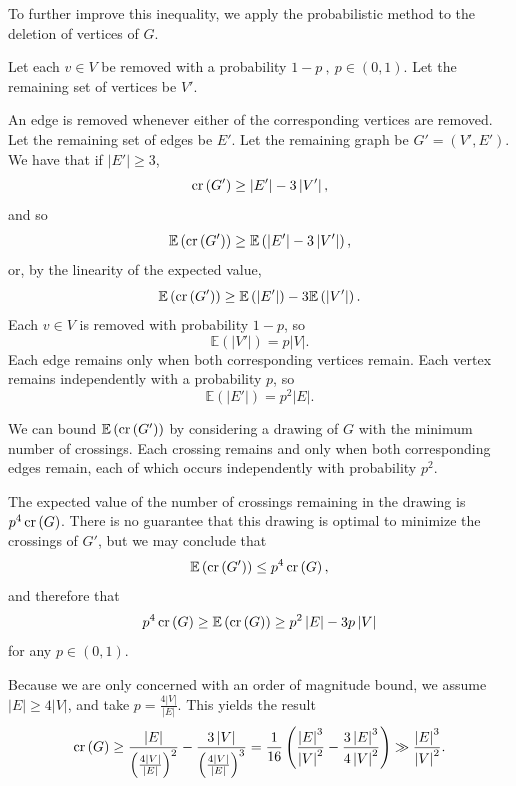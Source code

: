 \documentclass[12pt,reqno]{amsart}
\begin{document}
To further improve this inequality, we apply the probabilistic method
to the deletion of vertices of \(G\).

Let each \(v \in V\) be
removed with a probability \(1-p~,~  p \in (0,1)\). Let the remaining set of vertices be \(V'\). 

An edge is
removed whenever either of the corresponding vertices are removed. Let the remaining set of edges be \(E'\). Let the remaining graph be
\(G' = (V',E')\). We have that if \(\left\lvert E' \right\rvert \geq 3\),
\[
    \operatorname{cr}\left( G' \right) \geq \left\lvert E' \right\rvert - 3 \left\lvert V' \right\rvert 
,\]
and so
\[
    \mathbb{E} \left( \operatorname{cr}\left( G' \right)  \right) \geq \mathbb{E} \left( \left\lvert E' \right\rvert - 3 \left\lvert V' \right\rvert  \right) 
,\]
or, by the linearity of the expected value,
\[
    \mathbb{E} \left( \operatorname{cr}\left( G' \right)  \right) \geq \mathbb{E} \left( \left\lvert E' \right\rvert  \right) - 3 \mathbb{E} \left( \left\lvert V' \right\rvert  \right)    
.\]
Each \(v \in V\) is removed with probability \(1-p\), so
\[
    \mathbb{E} \left( \left\lvert V' \right\rvert  \right) = p \left\lvert V \right\rvert 
.\]
Each edge remains only when both corresponding vertices remain. Each vertex remains
independently with a probability \(p\), so 
\[
    \mathbb{E} \left( \left\lvert E' \right\rvert  \right) = p^{2}\left\lvert E \right\rvert 
.\]

We can bound \(\mathbb{E} \left( \operatorname{cr}\left( G' \right)  \right) \) by considering a drawing of \(G\) with the minimum number of crossings. 
Each crossing remains and only when both corresponding edges remain, each of which occurs independently with probability
\(p^{2}\).

The expected value of the number of crossings remaining in the drawing is \(p^{4} \operatorname{cr}\left( G \right) \).
There is no guarantee that this drawing is optimal to minimize the crossings of \(G'\), but we may conclude that
\[
    \mathbb{E} \left( \operatorname{cr}\left( G' \right)  \right) \leq p ^{4} \operatorname{cr}\left( G \right)
,\]
and therefore that
\[
    p^{4} \operatorname{cr}\left( G \right) \geq \mathbb{E} \left( \operatorname{cr}\left( G \right)  \right) \geq p^{2} \left\lvert E \right\rvert - 3 p \left\lvert V \right\rvert 
\]
for any \(p \in (0,1)\). 


Because we are only concerned with an order of magnitude bound, we assume \(\left\lvert E \right\rvert \geq 4\left\lvert V \right\rvert \), and take \(p = \frac{4\left\lvert V \right\rvert }{\left\lvert E \right\rvert }\).
This yields the result
\[
    \operatorname{cr}\left( G \right) \geq \frac{\left\lvert E \right\rvert }{\left( \frac{4 \left\lvert V \right\rvert }{\left\lvert E \right\rvert }   \right)^{2} } - \frac{3 \left\lvert V \right\rvert }{\left( \frac{4 \left\lvert V \right\rvert }{\left\lvert E \right\rvert }  \right) ^{3} } = \frac{1}{16} \left( \frac{\left\lvert E \right\rvert ^{3} }{\left\lvert V \right\rvert ^{2}} - \frac{3 \left\lvert E \right\rvert ^{3} }{4 \left\lvert V \right\rvert ^{2}}  \right) \gg \frac{\left\lvert E \right\rvert ^{3} }{\left\lvert V \right\rvert ^{2}}
.\]
\end{document}
